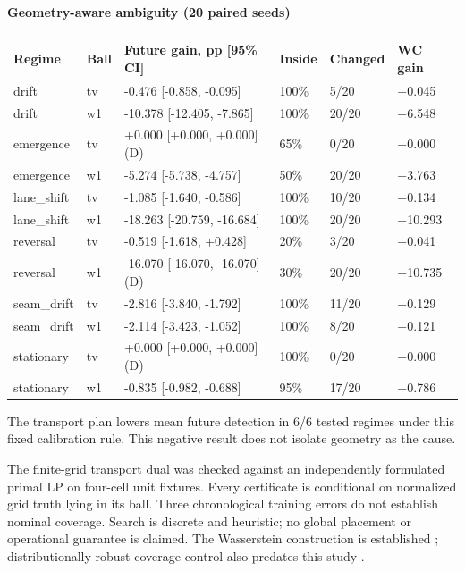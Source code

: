 \paragraph{Geometry-aware ambiguity (20 paired seeds)}
\begin{center}\small\begin{tabular}{llllll}
\toprule
Regime & Ball & Future gain, pp [95\% CI] & Inside & Changed & WC gain\\\midrule
drift & tv & -0.476 [-0.858, -0.095] & 100\% & 5/20 & +0.045\\
drift & w1 & -10.378 [-12.405, -7.865] & 100\% & 20/20 & +6.548\\
emergence & tv & +0.000 [+0.000, +0.000] (D) & 65\% & 0/20 & +0.000\\
emergence & w1 & -5.274 [-5.738, -4.757] & 50\% & 20/20 & +3.763\\
lane\_shift & tv & -1.085 [-1.640, -0.586] & 100\% & 10/20 & +0.134\\
lane\_shift & w1 & -18.263 [-20.759, -16.684] & 100\% & 20/20 & +10.293\\
reversal & tv & -0.519 [-1.618, +0.428] & 20\% & 3/20 & +0.041\\
reversal & w1 & -16.070 [-16.070, -16.070] (D) & 30\% & 20/20 & +10.735\\
seam\_drift & tv & -2.816 [-3.840, -1.792] & 100\% & 11/20 & +0.129\\
seam\_drift & w1 & -2.114 [-3.423, -1.052] & 100\% & 8/20 & +0.121\\
stationary & tv & +0.000 [+0.000, +0.000] (D) & 100\% & 0/20 & +0.000\\
stationary & w1 & -0.835 [-0.982, -0.688] & 95\% & 17/20 & +0.786\\
\bottomrule\end{tabular}\end{center}

The transport plan lowers mean future detection in 6/6 tested regimes under this fixed calibration rule. This negative result does not isolate geometry as the cause.

The finite-grid transport dual was checked against an independently formulated primal LP on four-cell unit fixtures. Every certificate is conditional on normalized grid truth lying in its ball. Three chronological training errors do not establish nominal coverage. Search is discrete and heuristic; no global placement or operational guarantee is claimed. The Wasserstein construction is established \citep{gao2023wasserstein,esfahani2018wasserstein}; distributionally robust coverage control also predates this study \citep{boskos2023coverage}.

